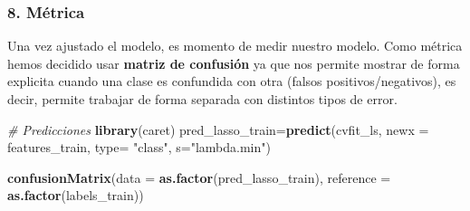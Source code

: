 \documentclass[]{article}
\newenvironment{Shaded}{\begin{snugshade}}{\end{snugshade}}
\newcommand{\KeywordTok}[1]{\textcolor[rgb]{0.13,0.29,0.53}{\textbf{#1}}}
\newcommand{\DataTypeTok}[1]{\textcolor[rgb]{0.13,0.29,0.53}{#1}}
\newcommand{\StringTok}[1]{\textcolor[rgb]{0.31,0.60,0.02}{#1}}
\newcommand{\CommentTok}[1]{\textcolor[rgb]{0.56,0.35,0.01}{\textit{#1}}}
\newcommand{\NormalTok}[1]{#1}
\begin{document}
\subsubsection{8. Métrica}\label{metrica}

Una vez ajustado el modelo, es momento de medir nuestro modelo. Como
métrica hemos decidido usar \textbf{matriz de confusión} ya que nos
permite mostrar de forma explicita cuando una clase es confundida con
otra (falsos positivos/negativos), es decir, permite trabajar de forma
separada con distintos tipos de error.

\begin{Shaded}
\begin{Highlighting}[]
\CommentTok{# Predicciones}
\KeywordTok{library}\NormalTok{(caret)}
\NormalTok{pred_lasso_train=}\KeywordTok{predict}\NormalTok{(cvfit_ls, }\DataTypeTok{newx =}\NormalTok{ features_train, }\DataTypeTok{type=} \StringTok{"class"}\NormalTok{, }\DataTypeTok{s=}\StringTok{"lambda.min"}\NormalTok{)}

\KeywordTok{confusionMatrix}\NormalTok{(}\DataTypeTok{data =} \KeywordTok{as.factor}\NormalTok{(pred_lasso_train), }\DataTypeTok{reference =} \KeywordTok{as.factor}\NormalTok{(labels_train))}
\end{Highlighting}
\end{Shaded}
\end{document}
